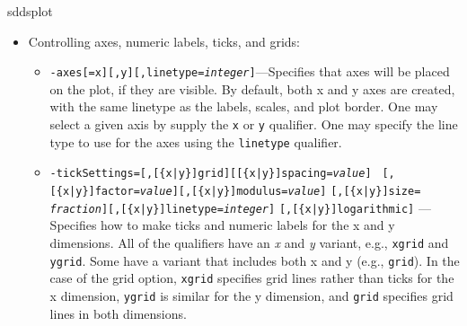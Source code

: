 \begin{sddsprog}{sddsplot}
\begin{itemize}
\begin{itemize}
  \item {\tt -sameScale[=x][,y][,global]}---Specifies that separate panels of data shall be displayed
on the same scales.  In other words, any autoscaling is done based on all of the data from a request,
rather than simply the data on a particular plot panel.  If given without these qualifiers, both x
and y are affected.  {\tt global} forces \verb|sddsplot| to impose the desired condition across all
plot requests.

  \item {\tt -zoom=[\{x|y\}Factor={\em value}][,\{x|p\}Center={\em value}][,\{y|q\}Center={\em
value}]} --- Specifies zoom and pan starting from the scales set by autoscaling or by {\tt -scales}.
A factor less than (greater than) unity zooms out (in).  For each dimension, one may specify the
center of the plot using either the

  \item {\tt -aspectRatio={\em value}} --- Specifies the y/x aspect ratio of the plot.  The value
must be nonzero.  If it is positive, then the desired aspect ratio is obtained by altering the
pspace.  If it is negative, the desired aspect ratio (the absolute value of the value given) is
obtained by altering the data coordinate range.

  \item {\tt -pSpace={\em hMin}{,\em hMax}{,\em vMin}{,\em vMax}}---This option is seldom used, but allows
control of the region of the panel that is mapped to data coordinates, said region being the ``plot space''
or ``pspace''.  The first two coordinates give the horizontal extent, while the second two give the 
vertical extent.  The coordinate values are between 0 and 1.  The defaults are [0.15, 0.9]x[0.15, 0.9].
  \end{itemize}
\item Controlling axes, numeric labels, ticks, and grids:
  \begin{itemize}
  \item {\tt -axes[=x][,y][,linetype={\em integer}]}---Specifies that axes will be placed on the plot,
if they are visible.  By default, both x and y axes are created, with the same linetype as the labels,
scales, and plot border.  One may select a given axis by supply the {\tt x} or {\tt y} qualifier.
One may specify the line type to use for the axes using the {\tt linetype} qualifier.

  \item {\tt -tickSettings=[,[\{x|y\}]grid][[\{x|y\}]spacing={\em value}]} {\tt
[,[\{x|y\}]factor={\em value}][,[\{x|y\}]modulus={\em value}]} {\tt [,[\{x|y\}]size={\em
fraction}][,[\{x|y\}]linetype={\em integer}]} {\tt [,[\{x|y\}]logarithmic]} --- Specifies how to make
ticks and numeric labels for the x and y dimensions. All of the qualifiers have an {\em x} and {\em
y} variant, e.g., {\tt xgrid} and {\tt ygrid}.  Some have a variant that includes both x and y (e.g.,
{\tt grid}).  In the case of the grid option, {\tt xgrid} specifies grid lines rather than ticks for
the x dimension, {\tt ygrid} is similar for the y dimension, and {\tt grid} specifies grid lines in
both dimensions.


\end{itemize}
\end{itemize}
\end{sddsprog}
